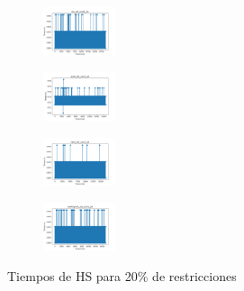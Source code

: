 \begin{figure}[H]
\begin{subfigure}
    \end{subfigure}
    \hfill
    \begin{subfigure}
        \centering
        \includegraphics[width=0.234\textwidth]{img/hs/iris_set_const_20_3773969821_time.png}
    \end{subfigure}
    \hfill
    \begin{subfigure}
        \centering
        \includegraphics[width=0.234\textwidth]{img/hs/ecoli_set_const_20_3773969821_time.png}
    \end{subfigure}
    \hfill
    \begin{subfigure}
        \centering
        \includegraphics[width=0.234\textwidth]{img/hs/rand_set_const_20_3773969821_time.png}
    \end{subfigure}
    \hfill
    \begin{subfigure}
        \centering
        \includegraphics[width=0.234\textwidth]{img/hs/newthyroid_set_const_20_3773969821_time.png}
    \end{subfigure}
    \caption{Tiempos de HS para 20\% de restricciones}
\end{figure}

\vspace*{\fill}
\newpage
\vspace*{\fill}

